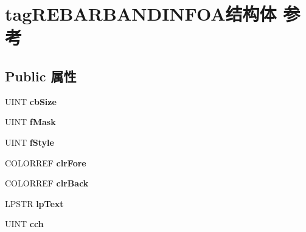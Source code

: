 \hypertarget{structtag_r_e_b_a_r_b_a_n_d_i_n_f_o_a}{}\section{tag\+R\+E\+B\+A\+R\+B\+A\+N\+D\+I\+N\+F\+O\+A结构体 参考}
\label{structtag_r_e_b_a_r_b_a_n_d_i_n_f_o_a}
\subsection*{Public 属性}
\begin{DoxyCompactItemize}
\item 
\mbox{\label{structtag_r_e_b_a_r_b_a_n_d_i_n_f_o_a_a00074770c8ff4fa978dac686ed812a22}} 
U\+I\+NT {\bfseries cb\+Size}
\item 
\mbox{\label{structtag_r_e_b_a_r_b_a_n_d_i_n_f_o_a_abc35531e597537d9775ff79102f901c0}} 
U\+I\+NT {\bfseries f\+Mask}
\item 
\mbox{\label{structtag_r_e_b_a_r_b_a_n_d_i_n_f_o_a_a2dd5b8634c897b56fb2b71203e5d75a2}} 
U\+I\+NT {\bfseries f\+Style}
\item 
\mbox{\label{structtag_r_e_b_a_r_b_a_n_d_i_n_f_o_a_a91f7c104c49a6cefc7b501460ae36f2b}} 
C\+O\+L\+O\+R\+R\+EF {\bfseries clr\+Fore}
\item 
\mbox{\label{structtag_r_e_b_a_r_b_a_n_d_i_n_f_o_a_a681117f090a179539ec4908f29886d8a}} 
C\+O\+L\+O\+R\+R\+EF {\bfseries clr\+Back}
\item 
\mbox{\label{structtag_r_e_b_a_r_b_a_n_d_i_n_f_o_a_a90504691a76d7c6419e1985fbe6a5a7e}} 
L\+P\+S\+TR {\bfseries lp\+Text}
\item 
\mbox{\label{structtag_r_e_b_a_r_b_a_n_d_i_n_f_o_a_a15b05f00b7605298202a56c072d09764}} 
U\+I\+NT {\bfseries cch}
\item 
\mbox{\label{structtag_r_e_b_a_r_b_a_n_d_i_n_f_o_a_a5a8dd37e25f13592b5abd4e5ac585eee}} 

\end{DoxyCompactItemize}

